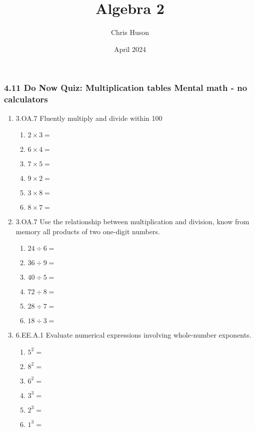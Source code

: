 \documentclass[12pt, twoside]{article}
\title{Algebra 2}
\author{Chris Huson}
\date{April 2024}
\begin{document}
\subsubsection*{4.11 Do Now Quiz: Multiplication tables \hfill Mental math - no calculators}
\begin{enumerate}[itemsep=0.5cm]

\item 3.OA.7 Fluently multiply and divide within 100
    \begin{multicols}{2}
    \begin{enumerate}[itemsep=0.5cm]
        \item $2 \times 3 =$
        \item $6 \times 4 =$
        \item $7 \times 5 =$
        \item $9 \times 2 =$
        \item $3 \times 8 =$
        \item $8 \times 7 =$
    \end{enumerate}
    \end{multicols}

\item 3.OA.7 Use the relationship between multiplication and division, know from memory all products of two one-digit numbers.
    \begin{multicols}{2}
    \begin{enumerate}[itemsep=0.5cm]
        \item $24 \div 6 =$
        \item $36 \div 9 =$
        \item $40 \div 5 =$
        \item $72 \div 8 =$
        \item $28 \div 7 =$
        \item $18 \div 3 =$
    \end{enumerate}
    \end{multicols}

\item 6.EE.A.1 Evaluate numerical expressions involving whole-number exponents.
    \begin{multicols}{2}
    \begin{enumerate}[itemsep=0.5cm]
        \item $5^2=$
        \item $8^2=$
        \item $6^2=$
        \item $3^3=$
        \item $2^3=$
        \item $1^3=$
    \end{enumerate}
    \end{multicols}


\end{enumerate}
\end{document}
